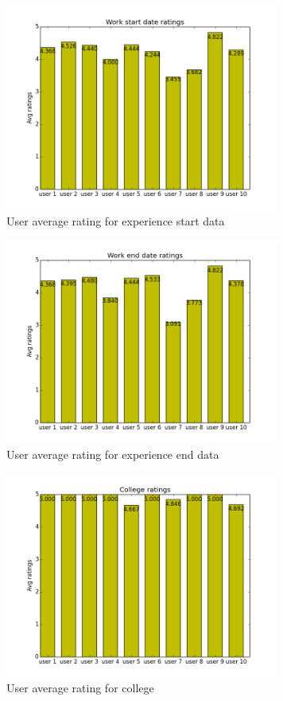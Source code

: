 \begin{figure}[H]
\centering
\includegraphics[width=90mm]{images/evaluation/average_experience_start_date_score.png}
\caption{User average rating for experience start data}
\label{fig:experiencestart}
\end{figure}

\begin{figure}[H]
\centering
\includegraphics[width=90mm]{images/evaluation/average_experience_end_date_score.png}
\caption{User average rating for experience end data}
\label{fig:experienceend}
\end{figure}

\begin{figure}[H]
\centering
\includegraphics[width=90mm]{images/evaluation/average_college_score.png}
\caption{User average rating for college}
\label{fig:college}
\end{figure}

